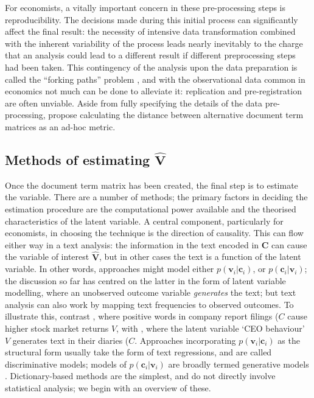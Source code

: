 \documentclass{article}
\begin{document}
For economists, a vitally important concern in these pre-processing steps is reproducibility. The decisions made during this initial process can significantly affect the final result: the necessity of intensive data transformation combined with the inherent variability of the process leads nearly inevitably to the charge that an analysis could lead to a different result if different preprocessing steps had been taken. This contingency of the analysis upon the data preparation is called the ``forking paths'' problem \parencite{gelmanStatisticalCrisisScience2014}, and with the observational data common in economics not much can be done to alleviate it: replication and pre-registration are often unviable. Aside from fully specifying the details of the data pre-processing, \textcite{dennyTextPreprocessingUnsupervised2018} propose calculating the distance between alternative document term matrices as an ad-hoc metric.

\subsection{Methods of estimating \(\hat{\mathbf{V}}\)}
Once the document term matrix has been created, the final step is to estimate the variable. There are a number of methods; the primary factors in deciding the estimation procedure are the computational power available and the theorised characteristics of the latent variable. A central component, particularly for economists, in choosing the technique is the direction of causality. This can flow either way in a text analysis: the information in the text encoded in \(\mathbf{C}\) can cause the variable of interest \(\hat{\mathbf{V}}\), but in other cases the text is a function of the latent variable. In other words, approaches might model either \(p(\mathbf{v}_i|\mathbf{c}_i)\), or \(p(\mathbf{c}_i|\mathbf{v}_i)\); the discussion so far has centred on the latter in the form of latent variable modelling, where an unobserved outcome variable \textit{generates} the text; but text analysis can also work by mapping text frequencies to observed outcomes. To illustrate this, contrast \textcite{jegadeeshWordPowerNew2013}, where positive words in company report filings (\(C\) cause higher stock market returns \(V\), with \textcite{bandieraCeoBehaviorFirm2020}, where the latent variable `CEO behaviour' \(V\) generates text in their diaries (\(C\). Approaches incorporating \(p(\mathbf{v}_i|\mathbf{c}_i)\) as the structural form usually take the form of text regressions, and are called discriminative models; models of \(p(\mathbf{c}_i|\mathbf{v}_i)\) are broadly termed generative models \parencite[81]{jurafskySpeechLanguageProcessing2009}.  Dictionary-based methods are the simplest, and do not directly involve statistical analysis; we begin with an overview of these.
\end{document}

